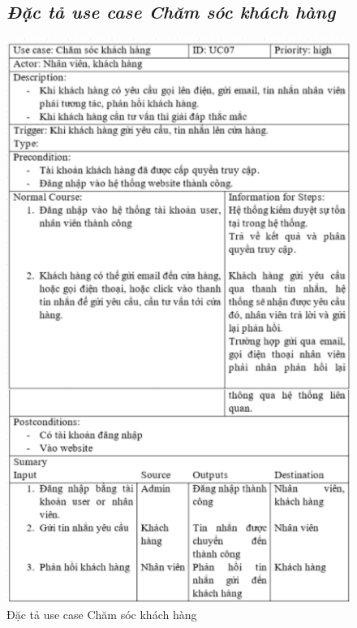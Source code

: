 \documentclass{report}
\begin{document}
\begin{figure}[htp]
    \subsection{\textit{Đặc tả use case Chăm sóc khách hàng}}
    \centering
    \includegraphics[scale = 1.2]{image/UC07.PNG}
    \caption{Đặc tả use case Chăm sóc khách hàng}
\end{figure}


\pagebreak
\end{document}
